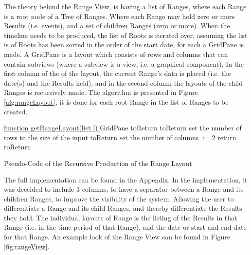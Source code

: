 \par The theory behind the Range View, is having a list of Ranges, where each Range is a root node of a Tree of Ranges. Where each Range may hold zero or more Results (i.e. events), and a set of children Ranges (zero or more). When the timeline needs to be produced, the list of Roots is iterated over, assuming the list is of Roots has been sorted in the order of the start date, for each a GridPane is made. A GridPane is a layout which consists of rows and columns that can contain subviews (where a subview is a view, i.e. a graphical component). In the first column of the of the layout, the current Range's data is placed (i.e. the date(s) and the Results held), and in the second column the layouts of the child Ranges is recursively made. The algorithm is presented in Figure \ref{alg:rangeLayout}, it is done for each root Range in the list of Ranges to be created.
\begin{algorithm}[H]
\underline{function getRangeLayout(list l)\; }
GridPane toReturn\;
toReturn set the number of rows to the size of the input\;
toReturn set the number of columns $:= 2$\;
return toReturn\;
\caption{Pseudo-Code of the Recursive Production of the Range Layout}
\label{alg:rangeLayout}
\end{algorithm}
\par The full implementation can be found in the Appendix. In the implementation, it was deceided to include 3 columns, to have a separator between a Range and its children Ranges, to improve the visibility of the system. Allowing the user to differentiate a Range and its child Ranges, and thereby differentiate the Results they hold. The individual layouts of Range is the listing of the Results in that Range (i.e. in the time period of that Range), and the date or start and end date for that Range. An example look of the Range View can be found in Figure \ref{fig:rangeView}.
